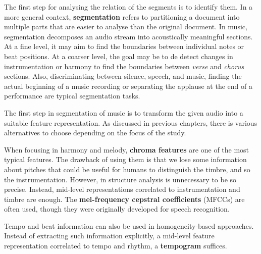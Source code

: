 \documentclass[a4paper, 9pt, twocolumn]{extarticle}
\begin{document}
%

The first step for analysing the relation of the segments is to identify them. In a more general context, \textbf{segmentation} refers to partitioning a document into multiple parts that are easier to analyse than the original document. In music, segmentation decomposes an audio stream into acoustically meaningful sections. At a fine level, it may aim to find the boundaries between individual notes or beat positions. At a coarser level, the goal may be to de detect changes in instrumentation or harmony to find the boundaries between \textit{verse} and \textit{chorus} sections. Also, discriminating between silence, speech, and music, finding the actual beginning of a music recording or separating the applause at the end of a performance are typical segmentation tasks.

The first step in segmentation of music is to transform the given audio into a suitable feature representation. As discussed in previous chapters, there is various alternatives to choose depending on the focus of the study. 

When focusing in harmony and melody, \textbf{chroma features} are one of the most typical features. The drawback of using them is that we lose some information about pitches that could be useful for humans to distinguish the timbre, and so the instrumentation. However, in structure analysis is unnecessary to be so precise. Instead, mid-level representations correlated to instrumentation and timbre are enough. The \textbf{mel-frequency cepstral coefficients} (MFCCs) are often used, though they were originally developed for speech recognition.

Tempo and beat information can also be used in homogeneity-based approaches. Instead of extracting such information explicitly, a mid-level feature representation correlated to tempo and rhythm, a \textbf{tempogram} suffices.
\end{document}
